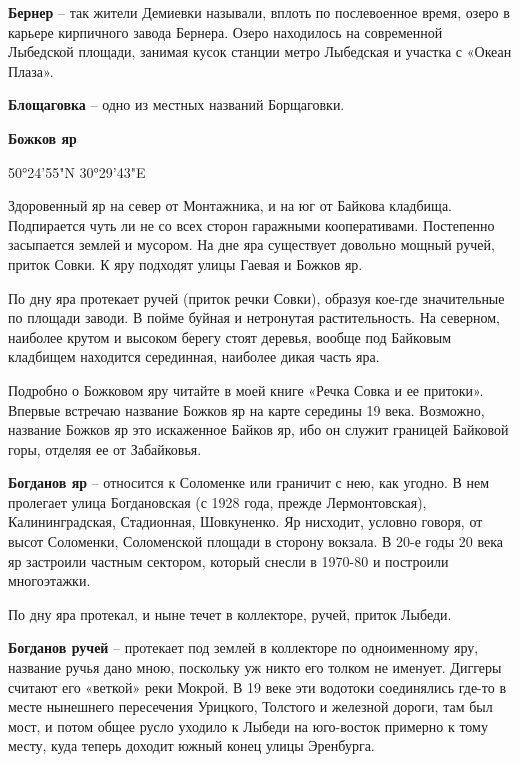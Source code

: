 \textbf{Бернер} – так жители Демиевки называли, вплоть по послевоенное время, озеро в карьере кирпичного завода Бернера. Озеро находилось на современной Лыбедской площади, занимая кусок станции метро Лыбедская и участка с «Океан Плаза».\\ 

\medskip

\textbf{Блощаговка} – одно из местных названий Борщаговки.\\

\medskip

\textbf{Божков яр} 

50°24'55"N 30°29'43"E

Здоровенный яр на север от Монтажника, и на юг от Байкова кладбища. Подпирается чуть ли не со всех сторон гаражными кооперативами. Постепенно засыпается землей и мусором. На дне яра существует довольно мощный ручей, приток Совки. К яру подходят улицы Гаевая и Божков яр. 

По дну яра протекает ручей (приток речки Совки), образуя кое-где значительные по площади заводи. В пойме буйная и нетронутая растительность. На северном, наиболее крутом и высоком берегу стоят деревья, вообще под Байковым кладбищем находится серединная, наиболее дикая часть яра.

Подробно о Божковом яру читайте в моей книге «Речка Совка и ее притоки». Впервые встречаю название Божков яр на карте середины 19 века. Возможно, название Божков яр это искаженное Байков яр, ибо он служит границей Байковой горы, отделяя ее от Забайковья.\\

\medskip

\textbf{Богданов яр} – относится к Соломенке или граничит с нею, как угодно. В нем пролегает улица Богдановская (с 1928 года, прежде Лермонтовская), Калининградская, Стадионная, Шовкуненко. Яр нисходит, условно говоря, от высот Соломенки, Соломенской площади в сторону вокзала. В 20-е годы 20 века яр застроили частным сектором, который снесли в 1970-80 и построили многоэтажки.

По дну яра протекал, и ныне течет в коллекторе, ручей, приток Лыбеди.\\ 

\medskip

\textbf{Богданов ручей} – протекает под землей в коллекторе по одноименному яру, название ручья дано мною, поскольку уж никто его толком не именует. Диггеры считают его «веткой» реки Мокрой. В 19 веке эти водотоки соединялись где-то в месте нынешнего пересечения Урицкого, Толстого и железной дороги, там был мост, и потом общее русло уходило к Лыбеди на юго-восток примерно к тому месту, куда теперь доходит южный конец улицы Эренбурга.

